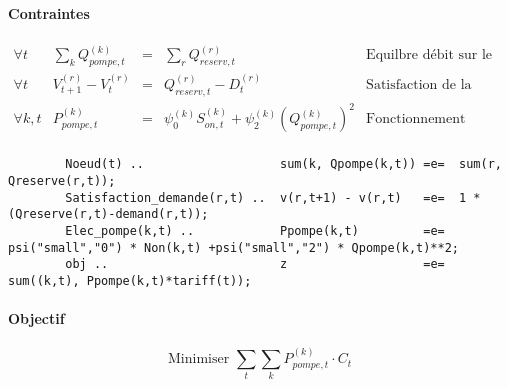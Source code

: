 \documentclass{article}
\begin{document}
\paragraph{Contraintes}
$$
\left.
    \begin{array}{lcccc}
        \forall t   &   \sum_k Q_{pompe,t}^{(k)}    & = &   \sum_r Q_{reserv,t}^{(r)}  &   \text{Equilbre débit sur le réseau}\\[0.2cm]
        \forall t   &   V_{t+1}^{(r)}-V_t^{(r)}     & = &   Q_{reserv,t}^{(r)} - D_t^{(r)} & \text{Satisfaction de la demande (pas horaire)}\\[0.2cm]
        \forall k,t &   P_{pompe,t}^{(k)}           & = &   \psi_0^{(k)}S_{on,t}^{(k)}  + \psi_2^{(k)}(Q_{pompe,t}^{(k)})^2 &   \text{Fonctionnement pompe}\\[0.2cm]
    \end{array}
\right.
$$
\begin{adjustbox}{max width=\textwidth}
    \begin{lstlisting}
        Noeud(t) ..                   sum(k, Qpompe(k,t)) =e=  sum(r, Qreserve(r,t));
        Satisfaction_demande(r,t) ..  v(r,t+1) - v(r,t)   =e=  1 * (Qreserve(r,t)-demand(r,t));
        Elec_pompe(k,t) ..            Ppompe(k,t)         =e=  psi("small","0") * Non(k,t) +psi("small","2") * Qpompe(k,t)**2;
        obj ..                        z                   =e=  sum((k,t), Ppompe(k,t)*tariff(t));
    \end{lstlisting}
\end{adjustbox}

\paragraph{Objectif}
$$
    \text{Minimiser }   \sum_t \sum_k P_{pompe,t}^{(k)}\cdot C_t
$$
\end{document}

